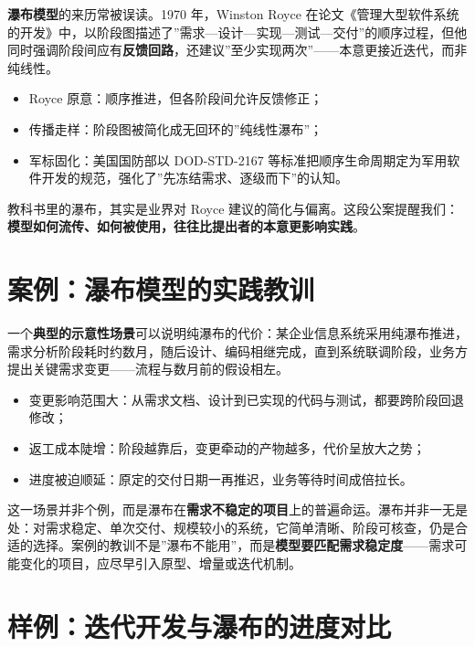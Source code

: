 \documentclass[12pt,a4paper,twoside,openany]{ctexbook}
\numberwithin{figure}{chapter}
\numberwithin{table}{chapter}
\providecommand{\tightlist}{\setlength{\itemsep}{0pt}\setlength{\parskip}{0pt}}
\begin{document}
\textbf{瀑布模型}的来历常被误读。1970 年，Winston Royce
在论文《管理大型软件系统的开发》中，以阶段图描述了''需求---设计---实现---测试---交付''的顺序过程，但他同时强调阶段间应有\textbf{反馈回路}，还建议''至少实现两次''------本意更接近迭代，而非纯线性。

\begin{itemize}
\tightlist
\item
  Royce 原意：顺序推进，但各阶段间允许反馈修正；
\item
  传播走样：阶段图被简化成无回环的''纯线性瀑布''；
\item
  军标固化：美国国防部以 DOD-STD-2167
  等标准把顺序生命周期定为军用软件开发的规范，强化了''先冻结需求、逐级而下''的认知。
\end{itemize}

教科书里的瀑布，其实是业界对 Royce
建议的简化与偏离。这段公案提醒我们：\textbf{模型如何流传、如何被使用，往往比提出者的本意更影响实践}。

\section{案例：瀑布模型的实践教训}\label{ux6848ux4f8bux7011ux5e03ux6a21ux578bux7684ux5b9eux8df5ux6559ux8bad}

一个\textbf{典型的示意性场景}可以说明纯瀑布的代价：某企业信息系统采用纯瀑布推进，需求分析阶段耗时约数月，随后设计、编码相继完成，直到系统联调阶段，业务方提出关键需求变更------流程与数月前的假设相左。

\begin{itemize}
\tightlist
\item
  变更影响范围大：从需求文档、设计到已实现的代码与测试，都要跨阶段回退修改；
\item
  返工成本陡增：阶段越靠后，变更牵动的产物越多，代价呈放大之势；
\item
  进度被迫顺延：原定的交付日期一再推迟，业务等待时间成倍拉长。
\end{itemize}

这一场景并非个例，而是瀑布在\textbf{需求不稳定的项目}上的普遍命运。瀑布并非一无是处：对需求稳定、单次交付、规模较小的系统，它简单清晰、阶段可核查，仍是合适的选择。案例的教训不是''瀑布不能用''，而是\textbf{模型要匹配需求稳定度}------需求可能变化的项目，应尽早引入原型、增量或迭代机制。

\section{样例：迭代开发与瀑布的进度对比}\label{ux6837ux4f8bux8fedux4ee3ux5f00ux53d1ux4e0eux7011ux5e03ux7684ux8fdbux5ea6ux5bf9ux6bd4}
\end{document}

